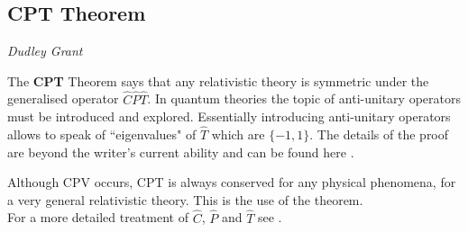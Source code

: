 \subsection{CPT Theorem}
\vspace{-1.0em}
\begin{center}
\tiny{\textit{Dudley Grant}}
\end{center}

The \textbf{CPT} Theorem says that any relativistic theory is symmetric under the generalised operator $\hat{C}\hat{P}\hat{T}$. In quantum theories the topic of anti-unitary operators must be introduced and explored. Essentially introducing anti-unitary operators allows to speak of ``eigenvalues" of $\hat{T}$ which are $\{-1,1\}$. The details of the proof are beyond the writer's current ability and can be found here \cite{CPT}.

Although CPV occurs, CPT is always conserved for any physical phenomena, for a very general relativistic theory. This is the use of the theorem.\\

For a more detailed treatment of $\hat{C}$, $\hat{P}$ and $\hat{T}$ see \cite{Martin+Shaw}.